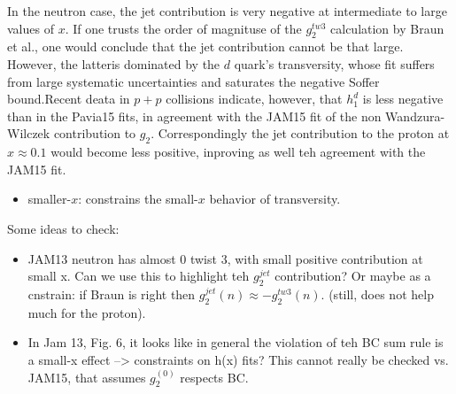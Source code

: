 \documentclass[preprintnumbers,floatfix,nofootinbib]{revtex4}
\begin{document}
In the neutron case, the jet contribution is very negative at intermediate to large values of $x$. If one trusts the order of magnituse of the $g_2^{tw3}$ calculation by Braun et al., one would conclude that the jet contribution cannot be that large. However, the latteris dominated by the $d$ quark's transversity, whose fit suffers from large systematic uncertainties and saturates the negative Soffer bound.Recent deata in $p+p$ collisions indicate, however, that $h_1^d$ is less negative than in the Pavia15 fits, in agreement with the JAM15 fit of the non Wandzura-Wilczek contribution to $g_2$. Correspondingly the jet contribution to the proton at $x \approx 0.1$ would become less positive, inproving as well teh agreement with the JAM15 fit.


\begin{itemize}
\item smaller-$x$: constrains the small-$x$ behavior of transversity.
\end{itemize}
Some ideas to check:
\begin{itemize}
\item JAM13 neutron has almost 0 twist 3, with small positive contribution at small x. Can we use this to highlight teh $g_2^{jet}$ contribution? Or maybe as a cnstrain: if Braun is right then $g_2^{jet}(n) \approx -g_2^{tw3}(n)$. (still, does not help much for the proton).
\item In Jam 13, Fig. 6, it looks like in general the violation of teh BC sum rule is a small-x effect --> constraints on h(x) fits? This cannot really be checked vs. JAM15, that assumes $g_2^(0)$ respects BC. 
\end{itemize}
\end{document}
